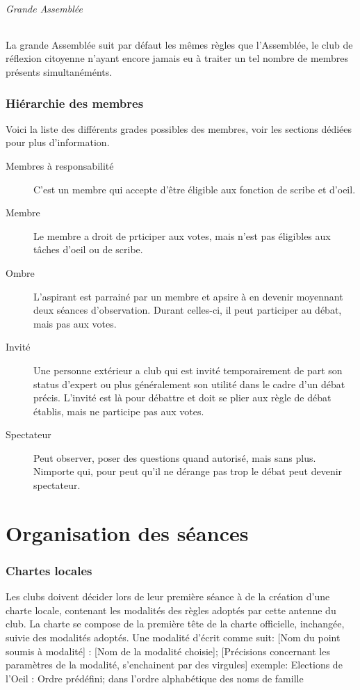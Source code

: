 \documentclass[a4paper,12pt]{article}
\begin{document}
\paragraph{Grande Assemblée}
La grande Assemblée suit par défaut les mêmes règles que l'Assemblée, le club de réflexion citoyenne n'ayant encore jamais eu à traiter un tel nombre de membres présents simultanéménts. 

\section{Hiérarchie des membres}
Voici la liste des différents grades possibles des membres, voir les sections dédiées pour plus d'information.
\begin{description}
 \item[Membres à responsabilité] C'est un membre qui accepte d'être éligible aux fonction de scribe et d'oeil.
 \item[Membre] Le membre a droit de prticiper aux votes, mais n'est pas éligibles aux tâches d'oeil ou de scribe.
 \item[Ombre] L'aspirant est parrainé par un membre et apsire à en devenir moyennant deux séances d'observation. Durant celles-ci, il peut participer au débat, mais pas aux votes.
 \item[Invité] Une personne extérieur a club qui est invité temporairement de part son status d'expert ou plus généralement son utilité dans le cadre d'un débat précis. L'invité est là pour débattre et doit se plier aux règle de débat établis, mais ne participe pas aux votes.
 \item[Spectateur] Peut observer, poser des questions quand autorisé, mais sans plus. Nimporte qui, pour peut qu'il ne dérange pas trop le débat peut devenir spectateur.
\end{description}



\part{Organisation des séances}

\section{Chartes locales}
Les clubs doivent décider lors de leur première séance à de la création d'une charte locale, contenant les modalités des règles adoptés par cette antenne du club. La charte se compose de la première tête de la charte officielle, inchangée, suivie des modalités adoptés. Une modalité d'écrit comme suit:
[Nom du point soumis à modalité] : [Nom de la modalité choisie]; [Précisions concernant les paramètres de la modalité, s'enchainent par des virgules]
exemple: Elections de l'Oeil : Ordre prédéfini; dans l'ordre alphabétique des noms de famille
\end{document}
